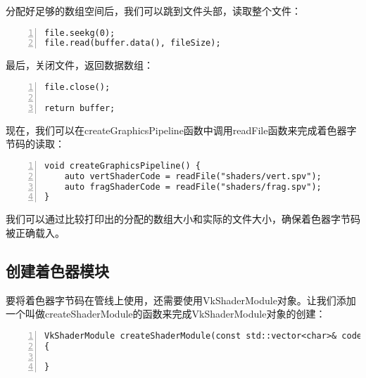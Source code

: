 \documentclass{ctexart}
\begin{document}
分配好足够的数组空间后，我们可以跳到文件头部，读取整个文件：

\begin{lstlisting}[language={[ANSI]C},keywordstyle=\color{blue!70},commentstyle=\color{red!50!green!50!blue!50},frame=shadowbox, rulesepcolor=\color{red!20!green!20!blue!20},basicstyle=\small,numbers=left, numberstyle=\tiny,breaklines=true]
file.seekg(0);
file.read(buffer.data(), fileSize);
\end{lstlisting}

最后，关闭文件，返回数据数组：

\begin{lstlisting}[language={[ANSI]C},keywordstyle=\color{blue!70},commentstyle=\color{red!50!green!50!blue!50},frame=shadowbox, rulesepcolor=\color{red!20!green!20!blue!20},basicstyle=\small,numbers=left, numberstyle=\tiny,breaklines=true]
file.close();

return buffer;
\end{lstlisting}

现在，我们可以在createGraphicsPipeline函数中调用readFile函数来完成着色器字节码的读取：

\begin{lstlisting}[language={[ANSI]C},keywordstyle=\color{blue!70},commentstyle=\color{red!50!green!50!blue!50},frame=shadowbox, rulesepcolor=\color{red!20!green!20!blue!20},basicstyle=\small,numbers=left, numberstyle=\tiny,breaklines=true]
void createGraphicsPipeline() {
	auto vertShaderCode = readFile("shaders/vert.spv");
	auto fragShaderCode = readFile("shaders/frag.spv");
}
\end{lstlisting}

我们可以通过比较打印出的分配的数组大小和实际的文件大小，确保着色器字节码被正确载入。

\subsection{创建着色器模块}

要将着色器字节码在管线上使用，还需要使用VkShaderModule对象。让我们添加一个叫做createShaderModule的函数来完成VkShaderModule对象的创建：

\begin{lstlisting}[language={[ANSI]C},keywordstyle=\color{blue!70},commentstyle=\color{red!50!green!50!blue!50},frame=shadowbox, rulesepcolor=\color{red!20!green!20!blue!20},basicstyle=\small,numbers=left, numberstyle=\tiny,breaklines=true]
VkShaderModule createShaderModule(const std::vector<char>& code)
{

}
\end{lstlisting}
\end{document}
